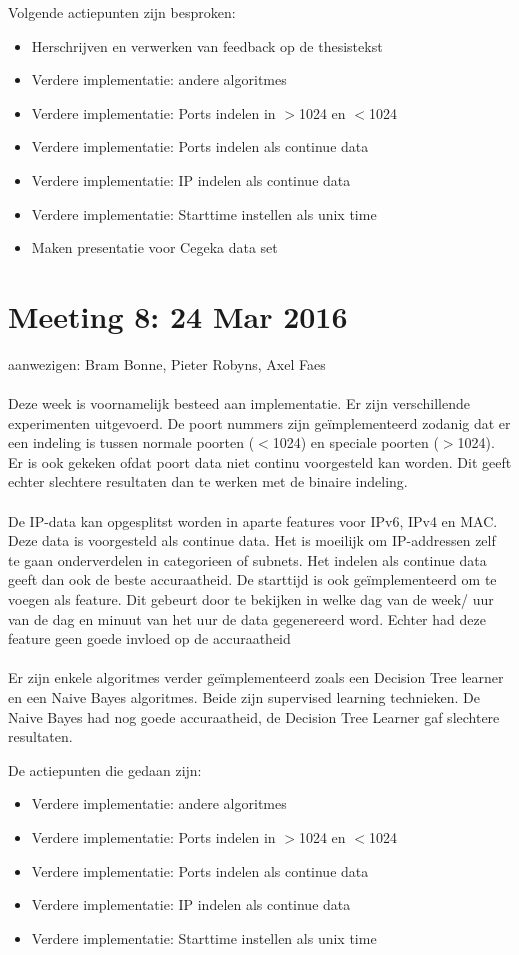 Volgende actiepunten zijn besproken:
\begin{itemize}  		
		\item Herschrijven en verwerken van feedback op de thesistekst 
        \item Verdere implementatie: andere algoritmes
        \item Verdere implementatie: Ports indelen in $>$1024 en $<$1024
        \item Verdere implementatie: Ports indelen als continue data
        \item Verdere implementatie: IP indelen als continue data
        \item Verdere implementatie: Starttime instellen als unix time
        \item Maken presentatie voor Cegeka data set
\end{itemize}
\section{Meeting 8: 24 Mar 2016}
aanwezigen: Bram Bonne, Pieter Robyns, Axel Faes\\\\
Deze week is voornamelijk besteed aan implementatie. Er zijn verschillende experimenten uitgevoerd. De poort nummers zijn ge\"implementeerd zodanig dat er een indeling is tussen normale poorten ($<$1024) en speciale poorten ($>$1024). Er is ook gekeken ofdat poort data niet continu voorgesteld kan worden. Dit geeft echter slechtere resultaten dan te werken met de binaire indeling.\\\\
De IP-data kan opgesplitst worden in aparte features voor IPv6, IPv4 en MAC. Deze data is voorgesteld als continue data. Het is moeilijk om IP-addressen zelf te gaan onderverdelen in categorieen of subnets. Het indelen als continue data geeft dan ook de beste accuraatheid.  De starttijd is ook ge\"implementeerd om te voegen als feature. Dit gebeurt door te bekijken in welke dag van de week/ uur van de dag en minuut van het uur de data gegenereerd word. Echter had deze feature geen goede invloed op de accuraatheid\\
\\
Er zijn enkele algoritmes verder ge\"implementeerd zoals een Decision Tree learner en een Naive Bayes algoritmes. Beide zijn supervised learning technieken. De Naive Bayes had nog goede accuraatheid, de Decision Tree Learner gaf slechtere resultaten.

De actiepunten die gedaan zijn:
\begin{itemize}  
        \item Verdere implementatie: andere algoritmes
        \item Verdere implementatie: Ports indelen in $>$1024 en $<$1024
        \item Verdere implementatie: Ports indelen als continue data
        \item Verdere implementatie: IP indelen als continue data
        \item Verdere implementatie: Starttime instellen als unix time
\end{itemize}

